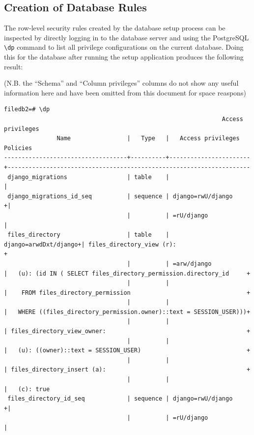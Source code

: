 \documentclass{article}
\begin{document}
\begin{landscape}
  \subsection{Creation of Database Rules}
  The row-level security rules created by the database setup process can be inspected by directly logging in to the database server and using the PostgreSQL \verb+\dp+ command to list all privilege configurations on the current database. Doing this for the database after running the setup application produces the following result:

  (N.B. the ``Schema'' and ``Column privileges'' columns do not show any useful information here and have been omitted from this document for space reaspons)
  {\small
\begin{verbatim}
filedb2=# \dp
                                                              Access privileges
               Name                |   Type   |   Access privileges                                 Policies
-----------------------------------+----------+-----------------------+---------------------------------------------------------------------
 django_migrations                 | table    |                       |
 django_migrations_id_seq          | sequence | django=rwU/django    +|
                                   |          | =rU/django            |
 files_directory                   | table    | django=arwdDxt/django+| files_directory_view (r):                                          +
                                   |          | =arw/django           |   (u): (id IN ( SELECT files_directory_permission.directory_id     +
                                   |          |                       |    FROM files_directory_permission                                 +
                                   |          |                       |   WHERE ((files_directory_permission.owner)::text = SESSION_USER)))+
                                   |          |                       | files_directory_view_owner:                                        +
                                   |          |                       |   (u): ((owner)::text = SESSION_USER)                              +
                                   |          |                       | files_directory_insert (a):                                        +
                                   |          |                       |   (c): true
 files_directory_id_seq            | sequence | django=rwU/django    +|
                                   |          | =rU/django            |

\end{verbatim}}
\end{landscape}
\end{document}
